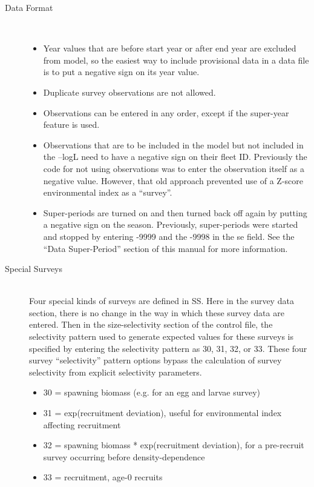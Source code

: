 \begin{description}
	\item[Data Format]\
	\begin{itemize}
		\item Year values that are before start year or after end year are excluded from model, so the easiest way to include provisional data in a data file is to put a negative sign on its year value.
		\item Duplicate survey observations are not allowed.
		\item Observations can be entered in any order, except if the super-year feature is used.
		\item Observations that are to be included in the model but not included in the –logL need to have a negative sign on their fleet ID.  Previously the code for not using observations was to enter the observation itself as a negative value.  However, that old approach prevented use of a Z-score environmental index as a “survey”.
		\item Super-periods are turned on and then turned back off again by putting a negative sign on the season.  Previously, super-periods were started and stopped by entering -9999 and the -9998 in the se field.  See the “Data Super-Period” section of this manual for more information.
	\end{itemize}
	\item[Special Surveys]\hfill\\
	Four special kinds of surveys are defined in SS.  Here in the survey data section, there is no change in the way in which these survey data are entered.  Then in the size-selectivity section of the control file, the selectivity pattern used to generate expected values for these surveys is specified by entering the selectivity pattern as 30, 31, 32, or 33.  These four survey “selectivity” pattern options bypass the calculation of survey selectivity from explicit selectivity parameters.
	\begin{itemize}
		\item 30 = spawning biomass (e.g. for an egg and larvae survey)
		\item 31 = exp(recruitment deviation), useful for environmental index affecting recruitment
		\item 32 = spawning biomass * exp(recruitment deviation), for a pre-recruit survey occurring before density-dependence
		\item 33 = recruitment, age-0 recruits
	\end{itemize}
	
\end{description}

